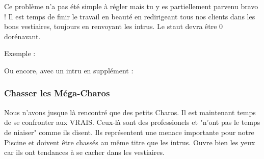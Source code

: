 \documentclass[a4paper, 12pt]{article}
\begin{document}
{    Ce problème n'a pas été simple à régler mais tu y es partiellement parvenu bravo !
    Il est temps de finir le travail en beauté en redirigeant tous nos clients
    dans les bons vestiaires, toujours en renvoyant les intrus.
    \newline \newline
    Le staut devra être 0 dorénavant.
    \newline \newline
    
    Exemple :
    \vspace{1cm}
    
    Ou encore, avec un intru en supplément :
    
    \vspace{2cm}
    
    \subsubsection{Chasser les Méga-Charos}

    Nous n'avons jusque là rencontré que des petits Charos. Il est maintenant
    temps de se confronter aux VRAIS. Ceux-là sont des professionels
    et "n'ont pas le temps de niaiser" comme ils disent. Ils représentent
    une menace importante pour notre Piscine et doivent être chassés au même titre
    que les intrus.
    \newline \newline
    Ouvre bien les yeux car ils ont tendances à se cacher dans les vestiaires.

}
\end{document}
